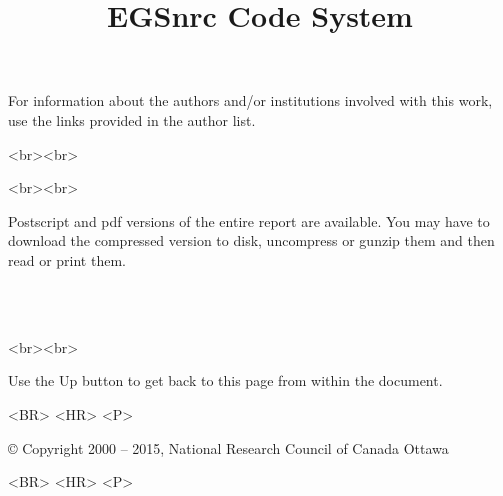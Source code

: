 \documentclass[12pt,twoside]{article}  %
\begin{document}
\begin{htmlonly}
For information about the authors and/or institutions involved with this
work, use the links provided in the author list.\\
\begin{rawhtml}
<br><br>
\end{rawhtml}


\begin{rawhtml}
<br><br>
\end{rawhtml}

Postscript and pdf versions of the entire report are available.  You may have to
download the compressed version to disk, uncompress or gunzip them and
then read or print them.\\
\begin{center}
\\
\\
\end{center}
\begin{rawhtml}
<br><br>
\end{rawhtml}

Use the Up button to get back to this page from within the document.
\begin{rawhtml}
<BR> <HR> <P>
\end{rawhtml}
\copyright 
Copyright 2000 -- 2015, National Research Council of Canada
Ottawa
\begin{rawhtml}
<BR> <HR> <P>
\end{rawhtml}
\end{htmlonly}

\pagestyle{empty}



\title{EGSnrc Code System}
\end{document}
